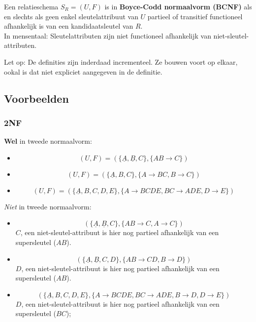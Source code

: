 \documentclass[normaalvormen.tex]{subfiles}
\begin{document}
\begin{de}
Een relatieschema $S_{R} = (U,F)$ is in \textbf{Boyce-Codd normaalvorm (BCNF)} als en slechts als geen enkel sleutelattribuut van $U$ partieel of transitief functioneel afhankelijk is van een kandidaatsleutel van $R$.\\
In mensentaal: Sleutelattributen zijn niet functioneel afhankelijk van niet-sleutel-attributen.
\end{de}

Let op: De definities zijn inderdaad incrementeel. Ze bouwen voort op elkaar, ookal is dat niet expliciet aangegeven in de definitie.

\subsection{Voorbeelden}
\subsubsection*{2NF}
\textbf{Wel} in tweede normaalvorm:
\begin{itemize}
\item
\[
(U,F) = (\{\underline{A}, \underline{B}, C\},\{AB\rightarrow C\})
\]
\item
\[
(U,F) = (\{\underline{A},B,C\},\{A\rightarrow BC, B\rightarrow C\})
\]
\item
\[
(U,F) = (\{\underline{A},B,C,D,E\},\{A\rightarrow BCDE, BC\rightarrow ADE, D\rightarrow E\})
\]
\end{itemize}
\textit{Niet} in tweede normaalvorm:
\begin{itemize}
\item
\[
(\{\underline{A}, \underline{B}, C\},\{AB\rightarrow C, A \rightarrow C\})
\]
$C$, een niet-sleutel-attribuut is hier nog partieel afhankelijk van een supersleutel ($AB$).
\item
\[
(\{\underline{A}, \underline{B}, C , D\},\{AB\rightarrow CD, B \rightarrow D\})
\]
$D$, een niet-sleutel-attribuut is hier nog partieel afhankelijk van een supersleutel ($AB$).
\item
\[
(\{\underline{A},B,C,D,E\},\{A\rightarrow BCDE, BC\rightarrow ADE, B\rightarrow D, D\rightarrow E\})
\]
$D$, een niet-sleutel-attribuut is hier nog partieel afhankelijk van een supersleutel ($BC$);
\end{itemize}
\end{document}
